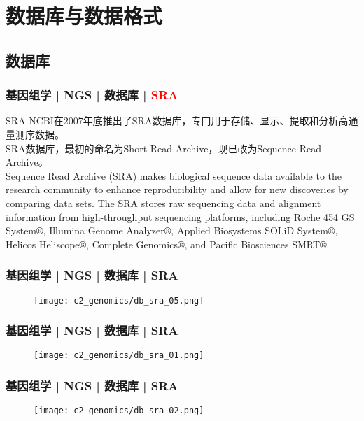 \section{数据库与数据格式}
\subsection{数据库}
\begin{frame}
  \frametitle{基因组学 | NGS | 数据库 | \textcolor{red}{SRA}}
  \begin{block}{SRA}
NCBI在2007年底推出了SRA数据库，专门用于存储、显示、提取和分析高通量测序数据。\\
\vspace{1em}
SRA数据库，最初的命名为Short Read Archive，现已改为Sequence Read Archive。\\
\vspace{1em}
Sequence Read Archive (SRA) makes biological sequence data available to the research community to enhance reproducibility and allow for new discoveries by comparing data sets. The SRA stores raw sequencing data and alignment information from high-throughput sequencing platforms, including Roche 454 GS System®, Illumina Genome Analyzer®, Applied Biosystems SOLiD System®, Helicos Heliscope®, Complete Genomics®, and Pacific Biosciences SMRT®. 
  \end{block}
\end{frame}
    
\begin{frame}
  \frametitle{基因组学 | NGS | 数据库 | SRA}
  \begin{figure}
    \centering
    \texttt{[image: c2\_genomics/db\_sra\_05.png]}
  \end{figure}
\end{frame}

\begin{frame}
  \frametitle{基因组学 | NGS | 数据库 | SRA}
  \begin{figure}
    \centering
    \texttt{[image: c2\_genomics/db\_sra\_01.png]}
  \end{figure}
\end{frame}
    
\begin{frame}
  \frametitle{基因组学 | NGS | 数据库 | SRA}
  \begin{figure}
    \centering
    \texttt{[image: c2\_genomics/db\_sra\_02.png]}
  \end{figure}
\end{frame}
    
